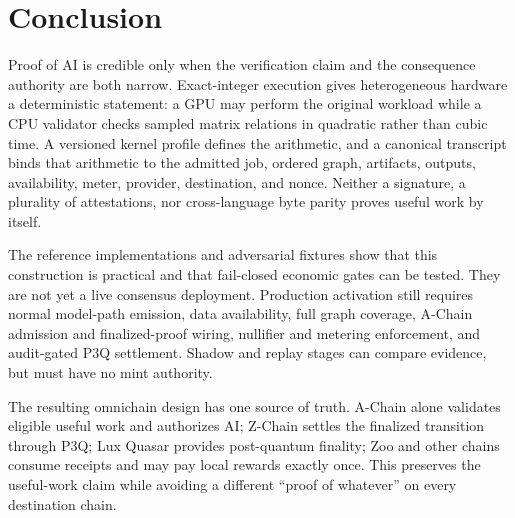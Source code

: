 \section{Conclusion}

Proof of AI is credible only when the verification claim and the consequence authority are
both narrow. Exact-integer execution gives heterogeneous hardware a deterministic
statement: a GPU may perform the original workload while a CPU validator checks sampled
matrix relations in quadratic rather than cubic time. A versioned kernel profile defines
the arithmetic, and a canonical transcript binds that arithmetic to the admitted job,
ordered graph, artifacts, outputs, availability, meter, provider, destination, and nonce.
Neither a signature, a plurality of attestations, nor cross-language byte parity proves
useful work by itself.

The reference implementations and adversarial fixtures show that this construction is
practical and that fail-closed economic gates can be tested. They are not yet a live
consensus deployment. Production activation still requires normal model-path emission,
data availability, full graph coverage, A-Chain admission and finalized-proof wiring,
nullifier and metering enforcement, and audit-gated P3Q settlement. Shadow and replay
stages can compare evidence, but must have no mint authority.

The resulting omnichain design has one source of truth. A-Chain alone validates eligible
useful work and authorizes \textsc{AI}; Z-Chain settles the finalized transition through
P3Q; Lux Quasar provides post-quantum finality; Zoo and other chains consume receipts and
may pay local rewards exactly once. This preserves the useful-work claim while avoiding a
different ``proof of whatever'' on every destination chain.
